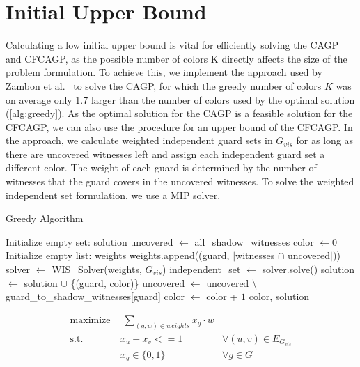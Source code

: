 \section{Initial Upper Bound}
Calculating a low initial upper bound is vital for efficiently solving the CAGP and CFCAGP, as the possible number of colors K directly affects the size of the problem formulation. To achieve this, we implement the approach used by Zambon et al.~\cite{zambon2014exact} to solve the CAGP, for which the greedy number of colors $K$ was on average only 1.7 larger than the number of colors used by the optimal solution (\cref{alg:greedy}). As the optimal solution for the CAGP is a feasible solution for the CFCAGP, we can also use the procedure for an upper bound of the CFCAGP. In the approach, we calculate weighted independent guard sets in $G_{vis}$ for as long as there are uncovered witnesses left and assign each independent guard set a different color. The weight of each guard is determined by the number of witnesses that the guard covers in the uncovered witnesses. To solve the weighted independent set formulation, we use a MIP solver.

\begin{algorithm}
\caption{Greedy Algorithm}\label{alg:greedy}
\fontsize{10}{12}\selectfont
\begin{algorithmic}[1]
\State Initialize empty set: solution
\State uncovered $\gets$ all\_shadow\_witnesses
\State color $\gets 0$
    \State Initialize empty list: weights
        \State weights.append((guard, $|$witnesses $\cap$ uncovered$|$))
    \EndFor
    \State solver $\gets$ WIS\_Solver(weights, $G_{vis}$)
    \State independent\_set $\gets$ solver.solve()
        \State solution $\gets$ solution $\cup$ \{(guard, color)\}
        \State uncovered $\gets$ uncovered $\setminus$ guard\_to\_shadow\_witnesses[guard]
    \EndFor 
    \State color $\gets$ color + $1$
\EndWhile
\State \Return color, solution
\EndProcedure
\end{algorithmic}
\end{algorithm}

\begin{align}
\label{eq_MIP_IS:f.0} \mbox{maximize}~& \;\sum_{(g, w)\in weights} x_{g}\cdot w& \\
\label{eq_MIP_IS:f.1} \mbox{s.t. } &x_{u} + x_{v} <= 1 & \forall (u,v) \in E_{G_{vis}}\\
\label{eq_MIP_IS:f.2}& x_{g} \in \{0,1\} & \forall g\in G
\end{align}

